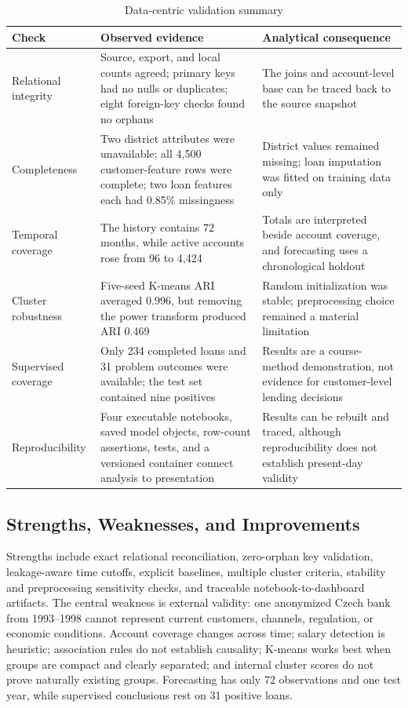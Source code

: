 \documentclass[conference]{IEEEtran}
\begin{document}
\begin{table}[t]
\caption{Data-centric validation summary}
\label{tab:audit}
\centering
\footnotesize
\renewcommand{\arraystretch}{0.96}
\begin{tabularx}{\textwidth}{p{} X X}
\toprule
\textbf{Check} & \textbf{Observed evidence} & \textbf{Analytical consequence} \\
\midrule
Relational integrity & Source, export, and local counts agreed; primary keys had no nulls or duplicates; eight foreign-key checks found no orphans & The joins and account-level base can be traced back to the source snapshot \\
Completeness & Two district attributes were unavailable; all 4,500 customer-feature rows were complete; two loan features each had 0.85\% missingness & District values remained missing; loan imputation was fitted on training data only \\
Temporal coverage & The history contains 72 months, while active accounts rose from 96 to 4,424 & Totals are interpreted beside account coverage, and forecasting uses a chronological holdout \\
Cluster robustness & Five-seed K-means ARI averaged 0.996, but removing the power transform produced ARI 0.469 & Random initialization was stable; preprocessing choice remained a material limitation \\
Supervised coverage & Only 234 completed loans and 31 problem outcomes were available; the test set contained nine positives & Results are a course-method demonstration, not evidence for customer-level lending decisions \\
Reproducibility & Four executable notebooks, saved model objects, row-count assertions, tests, and a versioned container connect analysis to presentation & Results can be rebuilt and traced, although reproducibility does not establish present-day validity \\
\bottomrule
\end{tabularx}
\end{table}

\subsection{Strengths, Weaknesses, and Improvements}

Strengths include exact relational reconciliation, zero-orphan key validation, leakage-aware time cutoffs, explicit baselines, multiple cluster criteria, stability and preprocessing sensitivity checks, and traceable notebook-to-dashboard artifacts. The central weakness is external validity: one anonymized Czech bank from 1993--1998 cannot represent current customers, channels, regulation, or economic conditions. Account coverage changes across time; salary detection is heuristic; association rules do not establish causality; K-means works best when groups are compact and clearly separated; and internal cluster scores do not prove naturally existing groups. Forecasting has only 72 observations and one test year, while supervised conclusions rest on 31 positive loans.
\end{document}
